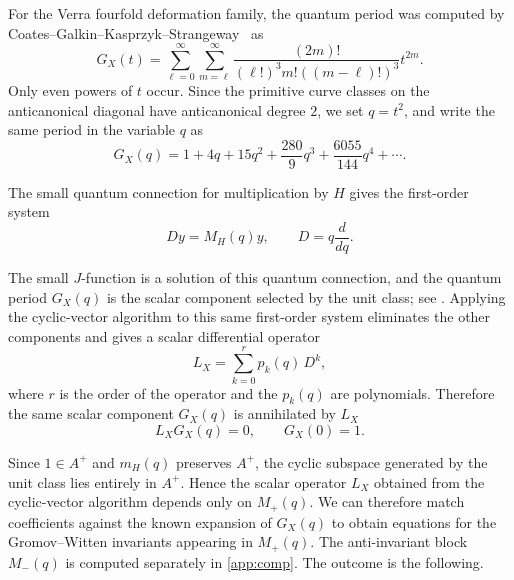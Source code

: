 \documentclass{amsart}
\theoremstyle{definition}
\theoremstyle{remark}
\begin{document}
For the Verra fourfold deformation family, the quantum period was computed by
Coates--Galkin--Kasprzyk--Strangeway~\citep{Coates2014QuantumPF} as
\begin{equation}\label{eq:qp-mw4}
G_X(t)
=
\sum_{\ell=0}^{\infty}
\sum_{m=\ell}^{\infty}
\frac{(2m)!}{(\ell!)^3m!((m-\ell)!)^3}
t^{2m}.
\end{equation}
Only even powers of \(t\) occur. Since the primitive curve classes on the
anticanonical diagonal have anticanonical degree \(2\), we set $q=t^2$, and write the same period in the variable \(q\) as
\[
G_X(q)
=
1+4q+15q^2+\frac{280}{9}q^3+\frac{6055}{144}q^4+\cdots .
\]

The small quantum connection for multiplication by \(H\) gives the first-order
system
\[
  D y=M_H(q)y,
  \qquad
  D=q\frac{d}{dq}.
\]
 
The small \(J\)-function is a solution of this quantum connection, and the
quantum period \(G_X(q)\) is the scalar component selected by the unit class; see
\cite[Section~2]{Iritani_2011}. Applying the cyclic-vector algorithm to this same
first-order system eliminates the other components and gives a scalar differential
operator
\[
L_X = \sum_{k=0}^{r} p_k(q)\,D^k,
\]
where \(r\) is the order of the operator and the \(p_k(q)\) are polynomials.
Therefore the same scalar component \(G_X(q)\) is annihilated by \(L_X\)
\begin{equation}\label{eq:qde}
L_X G_X(q) = 0, \qquad G_X(0) = 1.
\end{equation}

Since \(1\in A^+\) and \(m_H(q)\) preserves \(A^+\), the cyclic subspace generated
by the unit class lies entirely in \(A^+\). Hence the scalar operator \(L_X\) obtained
from the cyclic-vector algorithm depends only on \(M_+(q)\). We can therefore
match coefficients against the known expansion of \(G_X(q)\) to obtain equations
for the Gromov--Witten invariants appearing in \(M_+(q)\). The anti-invariant block
\(M_-(q)\) is computed separately in \cref{app:comp}. The outcome is the following.
\end{document}

